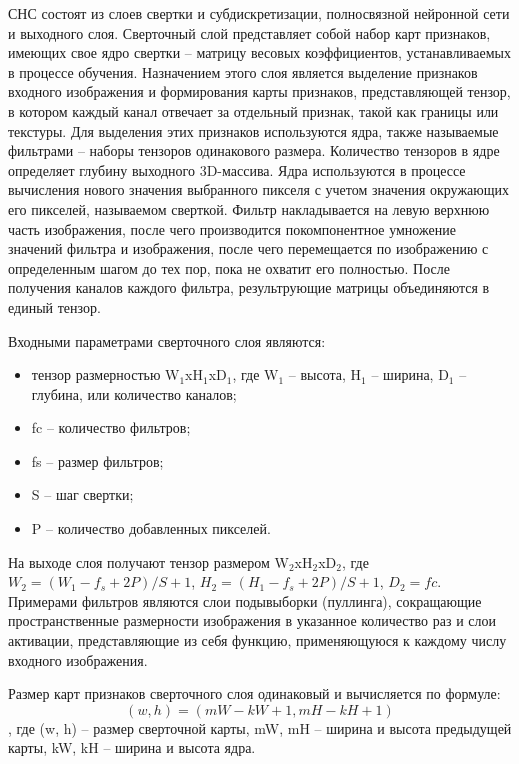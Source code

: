 СНС состоят из слоев свертки и субдискретизации, полносвязной нейронной сети и выходного слоя. Сверточный слой представляет собой набор карт признаков, имеющих свое ядро свертки -- матрицу весовых коэффициентов, устанавливаемых в процессе обучения. Назначением этого слоя является выделение признаков входного изображения и формирования карты признаков, представляющей тензор, в котором каждый канал отвечает за отдельный признак, такой как границы или текстуры. Для выделения этих признаков используются ядра, также называемые фильтрами -- наборы тензоров одинакового размера. Количество тензоров в ядре определяет глубину выходного 3D-массива. Ядра используются в процессе вычисления нового значения выбранного пикселя с учетом значения окружающих его пикселей, называемом сверткой. Фильтр накладывается на левую верхнюю часть изображения, после чего производится покомпонентное умножение значений фильтра и изображения, после чего перемещается по изображению с определенным шагом до тех пор, пока не охватит его полностью. После получения каналов каждого фильтра, результрующие матрицы объединяются в единый тензор.

Входными параметрами сверточного слоя являются:
\begin{itemize}
	\item тензор размерностью W$_{1}$xH$_{1}$xD$_{1}$, где W$_{1}$ -- высота, H$_{1}$ -- ширина, D$_{1}$ -- глубина, или количество каналов;
	\item fc -- количество фильтров;
	\item fs -- размер фильтров; 
	\item S -- шаг свертки;
	\item P -- количество добавленных пикселей.
\end{itemize}
На выходе слоя получают тензор размером W$_{2}$xH$_{2}$xD$_{2}$, где $W_2 = (W_1 - f_s + 2P)/S + 1$, $H_2 = (H_1 - f_s + 2P)/S + 1$, $D_2 = fc$. Примерами фильтров являются слои подывыборки (пуллинга), сокращающие пространственные размерности изображения в указанное количество раз и слои активации, представляющие из себя функцию, применяющуюся к каждому числу входного	изображения.

Размер карт признаков сверточного слоя одинаковый и вычисляется по формуле:
\[
(w, h) = (mW - kW + 1, mH - kH + 1)
\],
где (w, h) -- размер сверточной карты, mW, mH -- ширина и высота предыдущей карты, kW, kH -- ширина и высота ядра.

